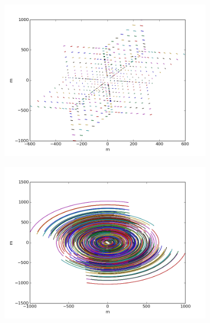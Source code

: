\documentclass[a4paper,10pt]{report}
\begin{document}
\begin{figure}[h]
\begin{mdframed}
\begin{subfigure}[b]{0.3\textwidth}
  \caption{}
 \end{subfigure}
 \begin{subfigure}[b]{0.3\textwidth}
  \includegraphics[width=\textwidth]{images/evla_observation/5min_snapshot_ncp.png}
  \caption{}
 \end{subfigure}
 \begin{subfigure}[b]{0.3\textwidth}
  \includegraphics[width=\textwidth]{images/evla_observation/6hr_ncp.png}
  \caption{}
 \end{subfigure}
 \begin{subfigure}[b]{0.3\textwidth}

\end{subfigure}
\end{mdframed}
\end{figure}
\end{document}
